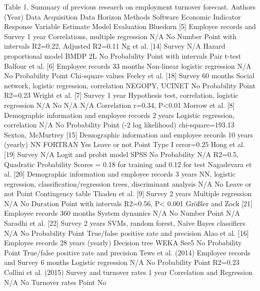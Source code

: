 Table 1. Summary of previous research on employment turnover forecast.
Authors (Year)	Data Acquisition	 Data Horizon	Methods	Software	Economic Indicator	Response Variable	Estimate	Model Evaluation
Bluedorn [5]	Employee records and Survey	1 year	Correlations, multiple regression	N/A	No	Number	Point with intervals	R2=0.22, 
Adjusted R2=0.11
Ng et al. [14]	Survey	N/A	Hazard proportional model	BMDP 2L	No	 Probability 	Point with intervals	Pair t-test 
Balfour et al. [6]	Employee records 	33 months	Non-linear logistic regression	N/A	No	Probability 	Point	Chi-square values 
Feeley et al. [18]	Survey	60 months	Social network, logistic regression, correlation	NEGOPY, UCINET	No	Probability 	Point	R2=0.23
Wright et al. [7]	Survey	1 year	Hypothesis test, correlation, logistic regression 	N/A	No	N/A	N/A	Correlation r=0.34, P<0.01
Morrow et al. [8]	Demographic information and employee records	2 years	Logistic regression, correlation	N/A	No	Probability 	Point	(-2 log likelihood) chi-square=193.13
Sexton, McMurtrey [15]	Demographic information and employee records	10 years (yearly)	NN	FORTRAN 	Yes	Leave or not	Point	Type I error=0.25%
Hong et al. [19]	Survey	N/A	Logit and probit model	SPSS	No	Probability 	N/A	R2=0.5, Quadratic Probability Scores = 0.18 for training and 0.12 for test
Nagadevara et al. [20]	Demographic information and employee records	3 years	NN, logistic regression, classification/regression trees, discriminant analysis	N/A	No	Leave or not	Point	Contingency table
Thaden et al. [9]	Survey	2 years	Multiple regression	N/A	No	Duration	Point with intervals	 R2=0.56, P< 0.001
Größler and Zock [21]	Employee records	360 months	System dynamics 	N/A	No	Number	Point	N/A
Saradhi et al. [22]	Survey	2 years	SVMs, random forest,  Naïve Bayes classifiers	N/A	No	Probability 	Point	True/false positive rate and precision
Alao et al. [16]	 Employee records  	28 years (yearly)	Decision tree	WEKA See5	No	Probability 	Point	True/false positive rate and precision
Tews et al. (2014)	Employee records and Survey	6 months	Logistic regression	N/A	No	Probability	Point	R2=0.23
Collini et al. (2015)	Survey and turnover rates  	1 year	Correlation and Regression	N/A	No	Turnover rates	Point	No
 
